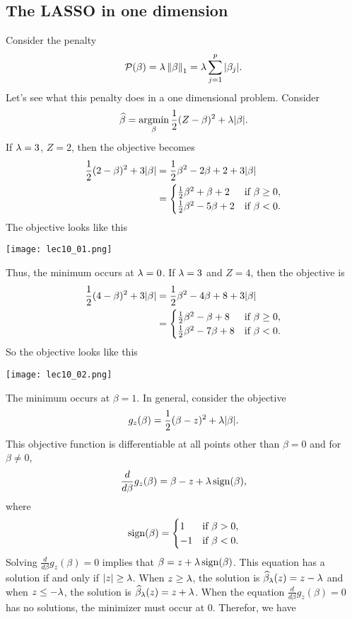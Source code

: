 \subsection{The LASSO in one dimension}
Consider the penalty
\[{\mathcal{P}}(\beta)= \lambda \left\|\beta\right\|_1 = \lambda \sum_{j=1}^p {\left\lvert\beta_j\right\rvert}. \]
Let's see what this penalty does in a one dimensional problem. Consider
\[\widehat{\beta}= \operatorname*{argmin}_\beta \frac{1}{2}(Z-\beta)^2+\lambda{\left\lvert\beta\right\rvert}. \]
If $\lambda = 3$, $Z=2$, then the objective becomes
\begin{align*}
    \frac{1}{2}(2-\beta)^2+3{\left\lvert\beta\right\rvert} &= \frac{1}{2}\beta^2 - 2\beta +2+3{\left\lvert\beta\right\rvert}\\
    &=\begin{cases}
        \frac{1}{2}\beta^2 +\beta+2 & \text{if } \beta \ge 0,\\
        \frac{1}{2}\beta^2 - 5\beta + 2 & \text{if } \beta < 0.
    \end{cases}
\end{align*}
The objective looks like this
\begin{center}
    \texttt{[image: lec10\_01.png]}
\end{center}
Thus, the minimum occurs at $\lambda = 0$. If $\lambda =3$ and $Z=4$, then the objective is 
\begin{align*}
    \frac{1}{2}(4-\beta)^2+3{\left\lvert\beta\right\rvert} &= \frac{1}{2}\beta^2 - 4\beta + 8 + 3{\left\lvert\beta\right\rvert} \\
    &=\begin{cases}
        \frac{1}{2}\beta^2 - \beta + 8 & \text{if } \beta \ge 0,\\
        \frac{1}{2}\beta^2 -7\beta + 8 & \text{if } \beta <0.
    \end{cases}
\end{align*}
So the objective looks like this
\begin{center}
    \texttt{[image: lec10\_02.png]}
\end{center}
The minimum occurs at $\beta = 1$. In general, consider the objective \[g_z(\beta) = \frac{1}{2}(\beta-z)^2 + \lambda{\left\lvert\beta\right\rvert}. \]
This objective function is differentiable at all points other than $\beta = 0$ and for $\beta \neq 0$, 
\[\frac{d}{d\beta}g_z(\beta) = \beta - z + \lambda \operatorname{sign}(\beta), \]
where
\[\operatorname{sign}(\beta) =\begin{cases}
    1 & \text{if } \beta > 0,\\
    -1 & \text{if } \beta < 0.
\end{cases} \]
Solving $\frac{d}{d\beta}g_z(\beta) = 0$ implies that $\beta = z+\lambda\operatorname{sign}(\beta)$. This equation has a solution if and only if ${\left\lvert z\right\rvert} \ge  \lambda$. When $z \ge \lambda$, the solution is $\widehat{\beta}_\lambda(z) = z-\lambda$ and when $z \le -\lambda$, the  solution is $\widehat{\beta}_\lambda(z)=z+\lambda$. When the equation $\frac{d}{d\beta} g_z(\beta)=0$ has no solutions, the minimizer must occur at $0$. Therefor, we have 
